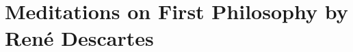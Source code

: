\chapter{Meditations on First Philosophy by Ren\'e Descartes}\autocite{Descartes1}
\label{descartesmeditations}




